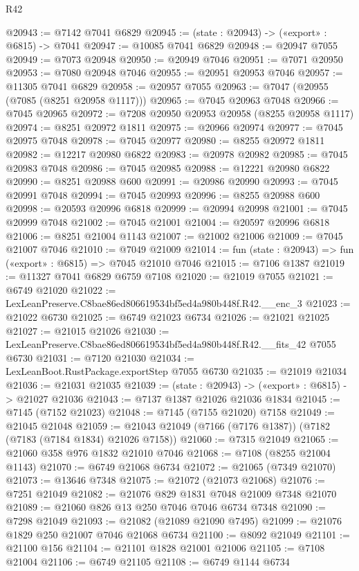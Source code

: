 \begin{lexlean}{R42}
\begin{coremodule}
{@20943 := @7142 @7041 @6829
@20945 := (state : @20943) -> («export» : @6815) -> @7041
@20947 := @10085 @7041 @6829
@20948 := @20947 @7055
@20949 := @7073 @20948
@20950 := @20949 @7046
@20951 := @7071 @20950
@20953 := @7080 @20948 @7046
@20955 := @20951 @20953 @7046
@20957 := @11305 @7041 @6829
@20958 := @20957 @7055
@20963 := @7047 (@20955 (@7085 (@8251 @20958 @1117)))
@20965 := @7045 @20963 @7048
@20966 := @7045 @20965
@20972 := @7208 @20950 @20953 @20958 (@8255 @20958 @1117)
@20974 := @8251 @20972 @1811
@20975 := @20966 @20974
@20977 := @7045 @20975 @7048
@20978 := @7045 @20977
@20980 := @8255 @20972 @1811
@20982 := @12217 @20980 @6822
@20983 := @20978 @20982
@20985 := @7045 @20983 @7048
@20986 := @7045 @20985
@20988 := @12221 @20980 @6822
@20990 := @8251 @20988 @600
@20991 := @20986 @20990
@20993 := @7045 @20991 @7048
@20994 := @7045 @20993
@20996 := @8255 @20988 @600
@20998 := @20593 @20996 @6818
@20999 := @20994 @20998
@21001 := @7045 @20999 @7048
@21002 := @7045 @21001
@21004 := @20597 @20996 @6818
@21006 := @8251 @21004 @1143
@21007 := @21002 @21006
@21009 := @7045 @21007 @7046
@21010 := @7049 @21009
@21014 := fun (state : @20943) => fun («export» : @6815) => @7045 @21010 @7046
@21015 := @7106 @1387
@21019 := @11327 @7041 @6829 @6759 @7108
@21020 := @21019 @7055
@21021 := @6749 @21020
@21022 := LexLeanPreserve.C8bae86ed806619534bf5ed4a980b448f.R42.__enc_3
@21023 := @21022 @6730
@21025 := @6749 @21023 @6734
@21026 := @21021 @21025
@21027 := @21015 @21026
@21030 := LexLeanPreserve.C8bae86ed806619534bf5ed4a980b448f.R42.__fits_42 @7055 @6730
@21031 := @7120 @21030
@21034 := LexLeanBoot.RustPackage.exportStep @7055 @6730
@21035 := @21019 @21034
@21036 := @21031 @21035
@21039 := (state : @20943) -> («export» : @6815) -> @21027 @21036
@21043 := @7137 @1387 @21026 @21036 @1834
@21045 := @7145 (@7152 @21023)
@21048 := @7145 (@7155 @21020) @7158
@21049 := @21045 @21048
@21059 := @21043 @21049 (@7166 (@7176 @1387)) (@7182 (@7183 (@7184 @1834) @21026 @7158))
@21060 := @7315 @21049
@21065 := @21060 @358 @976 @1832 @21010 @7046
@21068 := @7108 (@8255 @21004 @1143)
@21070 := @6749 @21068 @6734
@21072 := @21065 (@7349 @21070)
@21073 := @13646 @7348
@21075 := @21072 (@21073 @21068)
@21076 := @7251 @21049
@21082 := @21076 @829 @1831 @7048 @21009 @7348 @21070
@21089 := @21060 @826 @13 @250 @7046 @7046 @6734 @7348
@21090 := @7298 @21049
@21093 := @21082 (@21089 @21090 @7495)
@21099 := @21076 @1829 @250 @21007 @7046 @21068 @6734
@21100 := @8092 @21049
@21101 := @21100 @156
@21104 := @21101 @1828 @21001 @21006
@21105 := @7108 @21004
@21106 := @6749 @21105
@21108 := @6749 @1144 @6734
}
\end{coremodule}
\end{lexlean}
